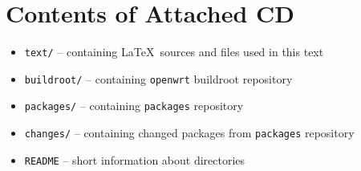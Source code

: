 \chapter{Contents of Attached CD}

\begin{itemize}
    \item {\tt text/} -- containing \LaTeX ~sources and files used in this text
    \item {\tt buildroot/} -- containing {\tt openwrt} buildroot repository
    \item {\tt packages/} -- containing {\tt packages} repository
    \item {\tt changes/} -- containing changed packages from {\tt packages} repository
    \item {\tt README} -- short information about directories
\end{itemize}
